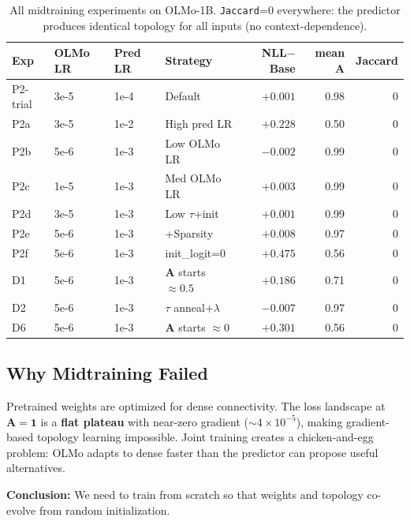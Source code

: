 \documentclass[11pt,a4paper]{article}
\newcommand{\A}{\mathbf{A}}
\begin{document}
\begin{table}[H]
\centering
\small
\begin{tabular}{llllrrr}
\toprule
\textbf{Exp} & \textbf{OLMo LR} & \textbf{Pred LR} & \textbf{Strategy} & \textbf{NLL$-$Base} & \textbf{mean $\A$} & \textbf{Jaccard} \\
\midrule
P2-trial & 3e-5 & 1e-4 & Default           & $+0.001$ & 0.98 & 0 \\
P2a      & 3e-5 & 1e-2 & High pred LR      & $+0.228$ & 0.50 & 0 \\
P2b      & 5e-6 & 1e-3 & Low OLMo LR       & $\mathbf{-0.002}$ & 0.99 & 0 \\
P2c      & 1e-5 & 1e-3 & Med OLMo LR       & $+0.003$ & 0.99 & 0 \\
P2d      & 3e-5 & 1e-3 & Low $\tau$+init   & $+0.001$ & 0.99 & 0 \\
P2e      & 5e-6 & 1e-3 & +Sparsity         & $+0.008$ & 0.97 & 0 \\
P2f      & 5e-6 & 1e-3 & init\_logit=0      & $+0.475$ & 0.56 & 0 \\
D1       & 5e-6 & 1e-3 & $\A$ starts $\approx 0.5$ & $+0.186$ & 0.71 & 0 \\
D2       & 5e-6 & 1e-3 & $\tau$ anneal+$\lambda$ & $\mathbf{-0.007}$ & 0.97 & 0 \\
D6       & 5e-6 & 1e-3 & $\A$ starts $\approx 0$ & $+0.301$ & 0.56 & 0 \\
\bottomrule
\end{tabular}
\caption{All midtraining experiments on OLMo-1B. \texttt{Jaccard}=0 everywhere: the predictor produces identical topology for all inputs (no context-dependence).}
\label{tab:midtrain}
\end{table}

\subsection{Why Midtraining Failed}

Pretrained weights are optimized for dense connectivity. The loss landscape at $\A=\mathbf{1}$ is a \textbf{flat plateau} with near-zero gradient ($\sim\!4\!\times\!10^{-5}$), making gradient-based topology learning impossible. Joint training creates a chicken-and-egg problem: OLMo adapts to dense faster than the predictor can propose useful alternatives.

\textbf{Conclusion:} We need to train from scratch so that weights and topology co-evolve from random initialization.

\end{document}
